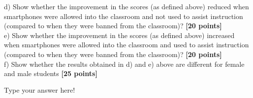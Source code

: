 \documentclass{article}
\begin{document}
d) Show whether the improvement in the scores (as defined above) reduced when smartphones were allowed into the classroom and not used to assist instruction (compared to when they were banned from the classroom)? {\bf [20 points]}\\

e) Show whether the improvement in the scores (as defined above) increased when smartphones were allowed into the classroom and used to assist instruction (compared to when they were banned from the classroom)? {\bf [20 points]}\\

f) Show whether the results obtained in d) and e) above are different for female and male students {\bf [25 points]}\\ 

\vspace{1cm}

{\color{blue}

Type your answer here!
}\\
\end{document}
